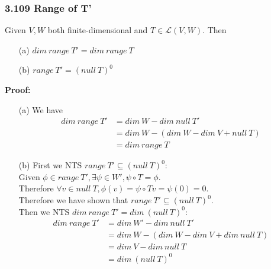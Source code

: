 \documentclass{article}
\begin{document}
\subsubsection*{3.109 Range of T'}
Given $V, W$ both finite-dimensional and $T \in \mathcal{L}(V, W)$. Then
\begin{itemize}
    \item[(a)] $dim\ range\ T' = dim\ range\ T$
    \item[(b)] $range\ T' = (null\ T)^0$
\end{itemize}
\textbf{Proof:}
\begin{addmargin}[1em]{0em}
    \begin{itemize}
        \item[(a)] We have
        \begin{equation*}
            \begin{split}
                dim\ range\ T' &= dim\ W - dim\ null\ T'\\
                &= dim\ W - (dim\ W - dim\ V + null\ T)\\
                &= dim\ range\ T
            \end{split}
        \end{equation*}
        \item[(b)] First we NTS $range\ T' \subseteq (null\ T)^0$:\\
        Given $\phi \in range\ T', \exists \psi \in W', \psi \circ T = \phi$.\\
        Therefore $\forall v \in null\ T, \phi(v) = \psi \circ Tv = \psi(0) = 0$.\\
        Therefore we have shown that $range\ T' \subseteq (null\ T)^0$.\\
        Then we NTS $dim\ range\ T' = dim\ (null\ T)^0$:\\
        \begin{equation*}
            \begin{split}
                dim\ range\ T' &= dim\ W' - dim\ null\ T'\\
                &= dim\ W - (dim\ W - dim\ V + dim\ null\ T)\\
                &= dim\ V - dim\ null\ T\\
                &= dim\ (null\ T)^0
            \end{split}
        \end{equation*}
    \end{itemize}
\end{addmargin}
\end{document}
